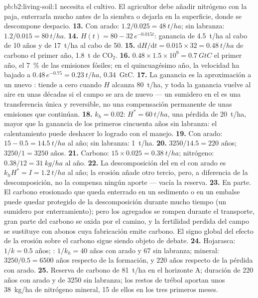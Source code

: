 \begin{solution}{pb:b2:living-soil:1}
necesita el cultivo. El agricultor debe añadir nitrógeno con la paja,
enterrarla mucho antes de la siembra o dejarla en la superficie, donde se
descompone despacio.
\textbf{13.} Con arado: $1.2/0.025 = \qty{48}{t/ha}$; sin labranza:
$1.2/0.015 = \qty{80}{t/ha}$.
\textbf{14.} $H(t) = 80 - 32\,e^{-0.015t}$: ganancia de \qty{4.5}{t/ha}
al cabo de 10 años y de \qty{17}{t/ha} al cabo de 50.
\textbf{15.} $\mathrm{d}H/\mathrm{d}t = 0.015\times 32 =
\qty{0.48}{t/ha}$ de carbono el primer año, \qty{1.8}{t} de
$\mathrm{CO_2}$.
\textbf{16.} $0.48\times 1.5\times 10^{9} = \qty{0.7}{GtC}$ el primer año,
el \qty{7}{\%} de las emisiones fósiles; en el quincuagésimo año, la
velocidad ha bajado a $0.48\,e^{-0.75} = \qty{0.23}{t/ha}$,
\qty{0.34}{GtC}.
\textbf{17.} La ganancia es la aproximación a un nuevo : tiende a cero cuando $H$ alcanza \qty{80}{t/ha}, y toda la
ganancia vuelve al aire en unas décadas si el campo se ara de nuevo ---
un sumidero en el  es una transferencia única y reversible, no una
compensación permanente de unas emisiones que continúan.
\textbf{18.} $k_h = 0.02$: $H^{*} = \qty{60}{t/ha}$, una pérdida de
\qty{20}{t/ha}, mayor que la ganancia de los primeros cincuenta años sin labranza: el calentamiento puede
deshacer lo logrado con el manejo.
\textbf{19.} Con arado: $15 - 0.5 = \qty{14.5}{t/ha}$ al año; sin
labranza: \qty{1}{t/ha}.
\textbf{20.} $3250/14.5 = 220$ años; $3250/1 = 3250$ años.
\textbf{21.} Carbono: $15\times 0.025 = \qty{0.38}{t/ha}$; nitrógeno:
$0.38/12 = \qty{31}{kg/ha}$ al año.
\textbf{22.} La descomposición del  en el  con
arado es $k_hH^{*} =
I = \qty{1.2}{t/ha}$ al año; la erosión añade otro tercio, pero, a
diferencia de la descomposición, no la compensa ningún aporte --- vacía la
reserva.
\textbf{23.} En parte. El carbono erosionado que queda enterrado en un
sedimento o en un embalse puede quedar protegido de la descomposición
durante mucho tiempo (un sumidero por enterramiento); pero los agregados se
rompen durante el transporte, gran parte del carbono se oxida por el
camino, y la fertilidad perdida del campo se sustituye con abonos cuya
fabricación emite carbono. El signo global del efecto de la erosión sobre
el carbono sigue siendo objeto de debate.
\textbf{24.} Hojarasca: $1/k = 0.5$ años; : $1/k_h = 40$ años con
arado y 67 sin labranza;  mineral: $3250/0.5 =
6500$ años respecto de la formación, y 220 años respecto de la pérdida con
arado.
\textbf{25.} Reserva de carbono de \qty{81}{t/ha} en el horizonte A;
duración de 220 años con arado y de 3250 sin labranza; los restos de trébol
aportan unos \qty{38}{kg/ha} de nitrógeno mineral, 15 de ellos en los tres
primeros meses.
\end{solution}
